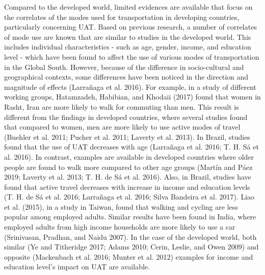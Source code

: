 \documentclass[]{elsarticle} %
\begin{document}
Compared to the developed world, limited evidences are available that
focus on the correlates of the modes used for transportation in
developing countries, particularly concerning UAT. Based on previous
research, a number of correlates of mode use are known that are similar
to studies in the developed world. This includes individual
characteristics - such as age, gender, income, and education level -
which have been found to affect the use of various modes of
transportation in the Global South. However, because of the difference
in socio-cultural and geographical contexts, some differences have been
noticed in the direction and magnitude of effects (Larrañaga et al.
2016). For example, in a study of different working groups, Hatamzadeh,
Habibian, and Khodaii (2017) found that women in Rasht, Iran are more
likely to walk for commuting than men. This result is different from the
findings in developed countries, where several studies found that
compared to women, men are more likely to use active modes of travel
(Buehler et al. 2011; Pucher et al. 2011; Laverty et al. 2013). In
Brazil, studies found that the use of UAT decreases with age (Larrañaga
et al. 2016; T. H. Sá et al. 2016). In contrast, examples are available
in developed countries where older people are found to walk more
compared to other age groups (Martín and Páez 2019; Laverty et al. 2013;
T. H. de Sá et al. 2016). Also, in Brazil, studies have found that
active travel decreases with increase in income and education levels (T.
H. de Sá et al. 2016; Larrañaga et al. 2016; Silva Bandeira et al.
2017). Liao et al. (2015), in a study in Taiwan, found that walking and
cycling are less popular among employed adults. Similar results have
been found in India, where employed adults from high income households
are more likely to use a car (Srinivasan, Pradhan, and Naidu 2007). In
the case of the developed world, both similar (Ye and Titheridge 2017;
Adams 2010; Cerin, Leslie, and Owen 2009) and opposite (Mackenbach et
al. 2016; Munter et al. 2012) examples for income and education level's
impact on UAT are available.
\end{document}
